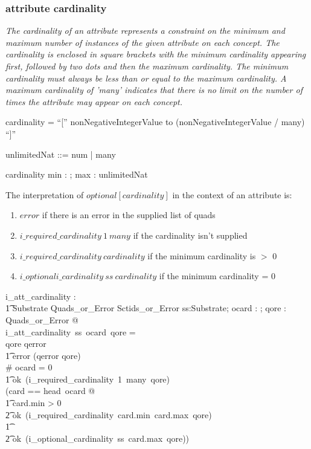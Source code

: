 \documentclass{article}
\def\bnf#1{{\scriptsize {{#1}} }}
\def\desc#1{{\small \textsl{{#1}} }}
\begin{document}
\subsubsection{attribute cardinality}
\begin{framed}
\desc{The cardinality of an attribute represents a constraint on the minimum and maximum number of instances of the given attribute on each concept. The cardinality is enclosed in square brackets with the minimum cardinality appearing first, followed by two dots and then the maximum cardinality. The minimum cardinality must always be less than or equal to the maximum cardinality. A maximum cardinality of 'many' indicates that there is no limit on the number of times the attribute may appear on each concept.}
\end{framed}
\begin{framed}
\bnf{cardinality = ``['' nonNegativeIntegerValue to (nonNegativeIntegerValue / many) ``]''}
\end{framed}

\begin{zed}
unlimitedNat ::= num \ldata \nat \rdata | many \\
\end{zed}
\begin{schema}{cardinality}
   min : \nat;
   max : unlimitedNat \\
\end{schema}
   
   
The interpretation of $optional[cardinality]$ in the context of an attribute is:
\begin{enumerate}[noitemsep]
\item $error$ if there is an error in the supplied list of quads 
\item $i\_required\_cardinality~1~many$ if the cardinality isn't supplied 
\item $i\_required\_cardinality~cardinality$ if the minimum cardinality is $>$ 0
\item $i\_optionali\_cardinality~ss~cardinality$ if the minimum cardinality = 0
\end{enumerate}


\begin{axdef}
   i\_att\_cardinality : \\
\t1 Substrate \fun \optional[cardinality] \fun Quads\_or\_Error \fun Sctids\_or\_Error
\where
   \forall ss:Substrate; ocard : \optional[cardinality]; qore : Quads\_or\_Error @ \\
   i\_att\_cardinality~ss~ocard~qore = \\
\IF qore \in \ran qerror \THEN \\
\t1 error (qerror \inv qore) \\
\ELSE \IF \# ocard = 0 \THEN \\
\t1 ok~(i\_required\_cardinality~1~many~qore) \\
\ELSE (\LET card == head~ocard @ \\
\t1 \IF card.min > 0 \THEN \\
\t2 ok~(i\_required\_cardinality~card.min~card.max~qore) \\
\t1 \ELSE \\
\t2 ok~(i\_optional\_cardinality~ss~card.max~qore))
\end{axdef}
\end{document}
